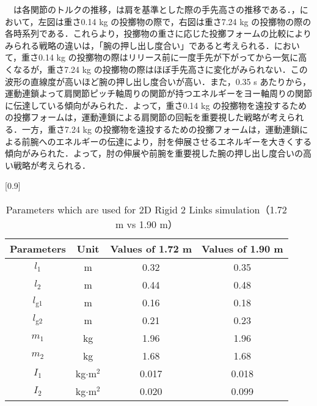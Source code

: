 　は各関節のトルクの推移，は肩を基準とした際の手先高さの推移である．，において，左図は重さ0.14 kg の投擲物の際で，右図は重さ7.24 kg の投擲物の際の各時系列である．これらより，投擲物の重さに応じた投擲フォームの比較によりみられる戦略の違いは，「腕の押し出し度合い」であると考えられる．において，重さ0.14 kg の投擲物の際はリリース前に一度手先が下がってから一気に高くなるが，重さ7.24 kg の投擲物の際はほぼ手先高さに変化がみられない．この波形の直線度が高いほど腕の押し出し度合いが高い．また，0.35 s あたりから，運動連鎖よって肩関節ピッチ軸周りの関節が持つエネルギーをヨー軸周りの関節に伝達している傾向がみられた．よって，重さ0.14 kg の投擲物を遠投するための投擲フォームは，運動連鎖による肩関節の回転を重要視した戦略が考えられる．一方，重さ7.24 kg の投擲物を遠投するための投擲フォームは，運動連鎖による前腕へのエネルギーの伝達により，肘を伸展させるエネルギーを大きくする傾向がみられた．よって，肘の伸展や前腕を重要視した腕の押し出し度合いの高い戦略が考えられる．
\begin{table}[tb]
  \begin{center}
    \caption{Parameters which are used for 2D Rigid 2 Links simulation（1.72 m vs 1.90 m）}
    \scalebox{0.9}[0.9]{
    \begin{tabular}{c|c|c|c}
      \hline
      Parameters & Unit & Values of 1.72 m & Values of 1.90 m \\
      \hline
      $l_{1}$ & m & 0.32 & 0.35 \\
      $l_{2}$ & m & 0.44 & 0.48 \\
      $l_{\mathrm{g1}}$ & m & 0.16 & 0.18 \\
      $l_{\mathrm{g2}}$ & m & 0.21 & 0.23 \\
      $m_{1}$ & kg & 1.96 & 1.96\\
      $m_{2}$ & kg & 1.68 & 1.68\\
      $I_{1}$ & kg$\cdot$$\mathrm{m}^2$ & 0.017 & 0.018 \\
      $I_{2}$ & kg$\cdot$$\mathrm{m}^2$ & 0.020 & 0.099 \\
      \hline
    \end{tabular}
    }
  \end{center}
\end{table}
